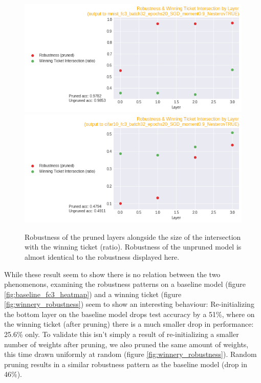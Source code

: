 \documentclass{article}
\begin{document}
\begin{figure}
  \includegraphics[width=\linewidth]{images/mnist_fc3_robustness_winnery_correlation.png}
  \label{fig:winnery_robustness_correlation}
  \includegraphics[width=\linewidth]{images/cifar10_fc3_robustness_winnery_correlation.png}
    \caption{Robustness of the pruned layers alongside the size of the intersection with the winning ticket (ratio). Robustness of the unpruned model is almost identical to the robustness displayed here.}
\end{figure}
While these result seem to show there is no relation between the two phenomenons, examining the robustness patterns on a baseline model (figure \ref{fig:baseline_fc3_heatmap}) and a winning ticket (figure \ref{fig:winnery_robustness}) seem to show an interesting behaviour: Re-initializing the bottom layer on the baseline model drops test accuracy by a 51\%, where on the winning ticket (after pruning) there is a much smaller drop in performance: 25.6\% only. To validate this isn't simply a result of re-initializing a smaller number of weights after pruning, we also pruned the same amount of weights, this time drawn uniformly at random (figure \ref{fig:winnery_robustness}). Random pruning results in a similar robustness pattern as the baseline model (drop in 46\%).\\
\end{document}
